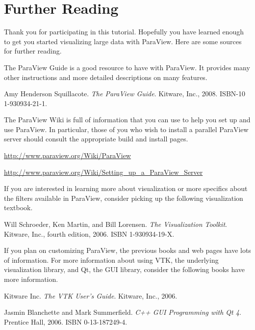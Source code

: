 \chapter{Further Reading}
\label{chap:FurtherReading}

Thank you for participating in this tutorial.  Hopefully you have learned
enough to get you started visualizing large data with ParaView.  Here are
some sources for further reading.

The ParaView Guide is a good resource to have with ParaView.  It provides
many other instructions and more detailed descriptions on many features.

\begin{reflist}
\item  Amy Henderson Squillacote.  \emph{The ParaView Guide}.  Kitware, Inc.,
  2008. ISBN-10 1-930934-21-1.
\end{reflist}

The ParaView Wiki is full of information that you can use to help you set
up and use ParaView.  In particular, those of you who wish to install a
parallel ParaView server should consult the appropriate build and install
pages.

\begin{reflist}
\item \href{http://www.paraview.org/Wiki/ParaView}{http://www.paraview.org/Wiki/ParaView}
\item \href{http://www.paraview.org/Wiki/Setting_up_a_ParaView_Server}{http://www.paraview.org/Wiki/Setting\_up\_a\_ParaView\_Server}
\end{reflist}

If you are interested in learning more about visualization or more
specifics about the filters available in ParaView, consider picking up the
following visualization textbook.

\begin{reflist}
\item Will Schroeder, Ken Martin, and Bill Lorensen.  \emph{The
  Visualization Toolkit}.  Kitware, Inc., fourth edition, 2006.  ISBN
  1-930934-19-X.
\end{reflist}

If you plan on customizing ParaView, the previous books and web pages have
lots of information.  For more information about using VTK, the underlying
visualization library, and Qt, the GUI library, consider the following
books have more information.

\begin{reflist}
\item Kitware Inc.  \emph{The VTK User’s Guide}.  Kitware, Inc., 2006.
\item Jasmin Blanchette and Mark Summerfield.  \emph{C++ GUI Programming
  with Qt 4}.  Prentice Hall, 2006.  ISBN 0-13-187249-4.
\end{reflist}

